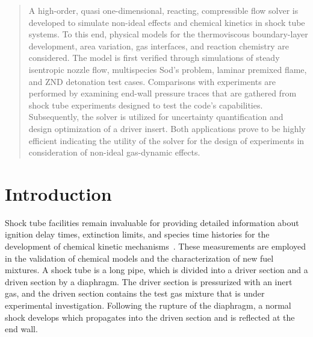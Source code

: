 
\date{Received: date / Accepted: date}


\maketitle

\begin{abstract}
A high-order, quasi one-dimensional, reacting, compressible flow solver is developed to simulate non-ideal effects and chemical kinetics in shock tube systems. To this end, physical models for the thermoviscous boundary-layer development, area variation, gas interfaces, and reaction chemistry are considered. The model is first verified through simulations of steady isentropic nozzle flow, multispecies Sod's problem, laminar premixed flame, and ZND detonation test cases. Comparisons with experiments are performed by examining end-wall pressure traces that are gathered from shock tube experiments designed to test the code's capabilities. Subsequently, the solver is utilized for uncertainty quantification and design optimization of a driver insert. Both applications prove to be highly efficient indicating the utility of the solver for the design of experiments in consideration of non-ideal gas-dynamic effects.
\end{abstract}
\section{Introduction}
\label{SEC_INTRO}
	Shock tube  facilities remain invaluable for providing detailed information 
	about ignition delay times, extinction limits, and species time histories for the development of chemical kinetic mechanisms~\cite{HANSON_PECS2014}. These measurements are employed in the validation of chemical models and the characterization of new fuel mixtures. A shock tube is a long pipe, which is divided into a driver section and a driven section by a diaphragm. The driver section is pressurized with an inert gas, and the driven section contains the test gas mixture that is under experimental investigation. Following the rupture of the diaphragm,
	a normal shock develops which propagates into the driven section and is reflected at the end wall.
	
